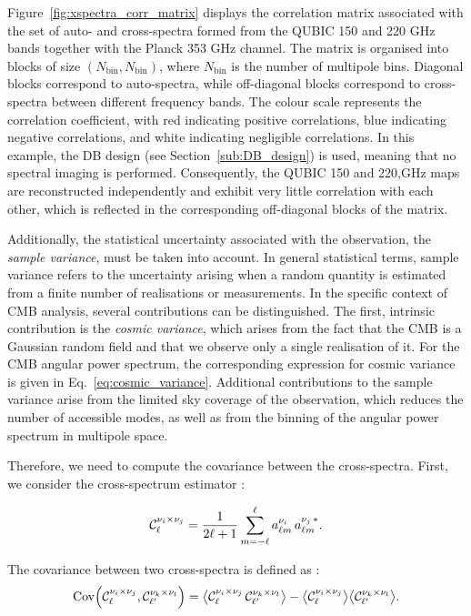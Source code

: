 \documentclass[../../thesis.tex]{subfiles}
\begin{document}
Figure~\ref{fig:xspectra_corr_matrix} displays the correlation matrix associated with the set of auto- and cross-spectra formed from the QUBIC 150 and 220 GHz bands together with the Planck 353 GHz channel. The matrix is organised into blocks of size $(N_{\mathrm{bin}}, N_{\mathrm{bin}})$, where $N_{\mathrm{bin}}$ is the number of multipole bins. Diagonal blocks correspond to auto-spectra, while off-diagonal blocks correspond to cross-spectra between different frequency bands. The colour scale represents the correlation coefficient, with red indicating positive correlations, blue indicating negative correlations, and white indicating negligible correlations. In this example, the DB design (see Section~\ref{sub:DB_design}) is used, meaning that no spectral imaging is performed. Consequently, the QUBIC 150 and 220,GHz maps are reconstructed independently and exhibit very little correlation with each other, which is reflected in the corresponding off-diagonal blocks of the matrix.

Additionally, the statistical uncertainty associated with the observation, the \emph{sample variance}, must be taken into account. In general statistical terms, sample variance refers to the uncertainty arising when a random quantity is estimated from a finite number of realisations or measurements.
In the specific context of CMB analysis, several contributions can be distinguished. The first, intrinsic contribution is the \emph{cosmic variance}, which arises from the fact that the CMB is a Gaussian random field and that we observe only a single realisation of it. For the CMB angular power spectrum, the corresponding expression for cosmic variance is given in Eq.~\ref{eq:cosmic_variance}. Additional contributions to the sample variance arise from the limited sky coverage of the observation, which reduces the number of accessible modes, as well as from the binning of the angular power spectrum in multipole space.

Therefore, we need to compute the covariance between the cross-spectra. First, we consider the cross-spectrum estimator :

\begin{equation}
    \mathcal{C}_{\ell}^{\nu_{i} \times \nu_{j}} = \frac{1}{2\ell+1} \sum_{m=-\ell}^{\ell} a^{\nu_i}_{\ell m}\, a^{\nu_j\,*}_{\ell m}.
\end{equation}

The covariance between two cross-spectra is defined as :
\begin{equation}
    \mathrm{Cov}\!\left(\mathcal{C}_{\ell}^{\nu_{i} \times \nu_{j}}, \mathcal{C}_{\ell'}^{\nu_{k} \times \nu_{l}}\right) = \bigl\langle \mathcal{C}_{\ell}^{\nu_{i} \times \nu_{j}}\,\mathcal{C}_{\ell'}^{\nu_{k} \times \nu_{l}} \bigr\rangle - \bigl\langle \mathcal{C}_{\ell}^{\nu_{i} \times \nu_{j}} \bigr\rangle \bigl\langle \mathcal{C}_{\ell'}^{\nu_{k} \times \nu_{l}} \bigr\rangle.
\end{equation}
\end{document}
